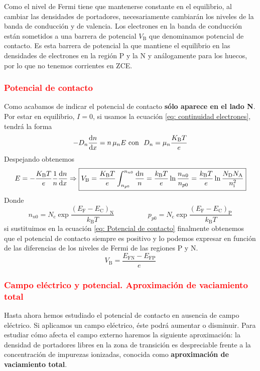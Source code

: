 \noindent Como el nivel de Fermi tiene que mantenerse constante en el equilibrio, al cambiar las densidades de portadores, necesariamente cambiarán los niveles de la banda de conducción y de valencia. Los electrones en la banda de conducción están sometidos a una barrera de potencial $V_\mathrm{B}$ que denominamos potencial de contacto. Es esta barrera de potencial la que mantiene el equilibrio en las densidades de electrones en la región P y la N y análogamente para los huecos, por lo que no tenemos corrientes en ZCE.
\subsubsection{\textcolor{red}{Potencial de contacto}}

Como acabamos de indicar el potencial de contacto \textbf{sólo aparece en el lado N}. Por estar en equilibrio, $I=0$, si usamos la ecuación \ref{eq: continuidad electrones}, tendrá la forma
\begin{equation*}
    -D_n\diff[]{n}{x}=n\,\mu_nE \ \text{con } \ D_n=\mu_n \frac{K_\mathrm{B}T}{e}
\end{equation*}
Despejando obtenemos
\begin{equation}
    E=-\frac{K_\mathrm{B} T}{e} \frac{1}{n} \diff[]{n}{x} \Rightarrow \boxed{V_\mathrm{B}=\frac{K_\mathrm{B} T}{e} \int_{n_{p0}}^{n_{n0}} \frac{\mathrm{d} n}{n}=\frac{k_\mathrm{B} T}{e} \ln{\frac{n_{n0}}{n_{p0}}}=\frac{k_\mathrm{B} T}{e} \ln{\frac{N_\mathrm{D}N_\mathrm{A}}{n_\mathrm{i}^2}}}
    \label{eq: Potencial de contacto}
\end{equation}
Donde $$n_{n0}=N_\mathrm{c}\exp \frac{(E_\mathrm{F}-E_\mathrm{C})_\mathrm{N}}{k_\mathrm{B}T} \hspace{2cm} p_{p0}=N_\mathrm{c}\exp \frac{(E_\mathrm{F}-E_\mathrm{C})_\mathrm{P}}{k_\mathrm{B}T}$$
si sustituimos en la ecuación \ref{eq: Potencial de contacto} finalmente obtenemos que el potencial de contacto siempre es positivo y lo podemos expresar en función de las diferencias de los niveles de Fermi de las regiones P y N.
\begin{equation}
    V_\mathrm{B}=\frac{E_\mathrm{FN}-E_\mathrm{FP}}{e}
\end{equation}
\newpage
\subsubsection{\textcolor{red}{Campo eléctrico y potencial. Aproximación de vaciamiento total}} \label{sec: Vaciamiento total}
Hasta ahora hemos estudiado el potencial de contacto en ausencia de campo eléctrico. Si aplicamos un campo eléctrico, éste podrá aumentar o disminuir. Para estudiar cómo afecta el campo externo haremos la siguiente aproximación: la densidad de portadores libres en la zona de transición es despreciable frente a la concentración de impurezas ionizadas, conocida como \textbf{aproximación de vaciamiento total}.\\

